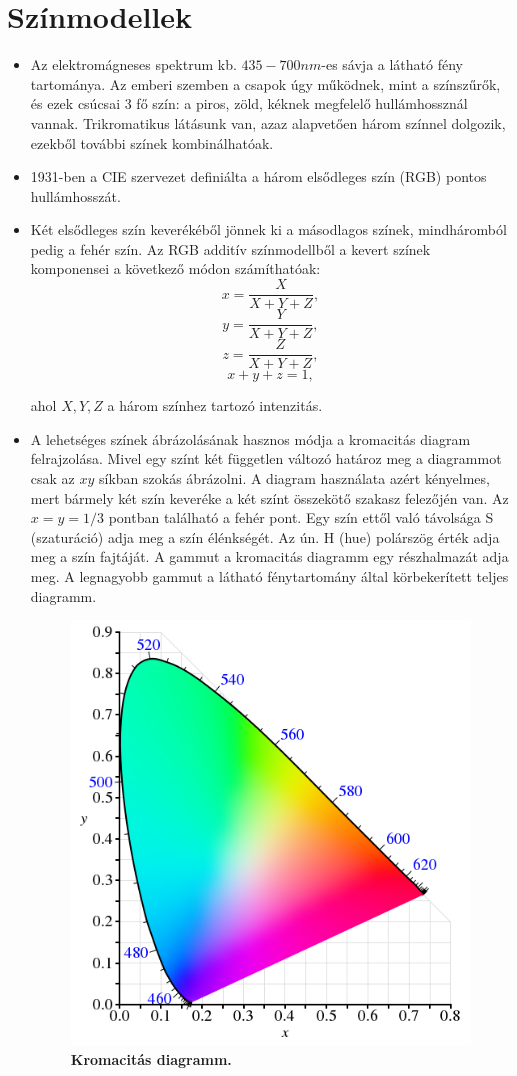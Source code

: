 \documentclass[12pt]{article}
\theoremstyle{plain}
\begin{document}
\section{Színmodellek}
\begin{itemize}
    \item Az elektromágneses spektrum kb. $435 - 700 nm$-es sávja a látható fény tartománya. Az emberi szemben a csapok úgy működnek, mint a színszűrők, és ezek csúcsai 3 fő szín: a piros, zöld, kéknek megfelelő hullámhossznál vannak. Trikromatikus látásunk van, azaz alapvetően három színnel dolgozik, ezekből további színek kombinálhatóak.
    \item 1931-ben a CIE szervezet definiálta a három elsődleges szín (RGB) pontos hullámhosszát.
    \item Két elsődleges szín keverékéből jönnek ki a másodlagos színek, mindháromból pedig a fehér szín. Az RGB additív színmodellből a kevert színek komponensei a következő módon számíthatóak:
    $$x = \frac{X}{X+Y+Z},$$
    $$y = \frac{Y}{X+Y+Z},$$
    $$z = \frac{Z}{X+Y+Z},$$
    $$x+y+z = 1,$$
    
    ahol $X,Y,Z$ a három színhez tartozó intenzitás.
    
    \item A lehetséges színek ábrázolásának hasznos módja a kromacitás diagram felrajzolása. Mivel egy színt két független változó határoz meg a diagrammot csak az $xy$ síkban szokás ábrázolni. A diagram használata azért kényelmes, mert bármely két szín keveréke a két színt összekötő szakasz felezőjén van. Az $x=y=1/3$ pontban található a fehér pont. Egy szín ettől való távolsága S (szaturáció) adja meg a szín élénkségét. Az ún. H (hue) polárszög érték adja meg a szín fajtáját.  A gammut a kromacitás diagramm egy részhalmazát adja meg. A legnagyobb gammut a látható fénytartomány által körbekerített teljes diagramm.
    
    
    \begin{figure}[H]
    \begin{center}
    \includegraphics[width=0.55\linewidth]{media/chro.png}
    \caption{\textbf{Kromacitás diagramm.}} 
    \label{fig:chro}
    \end{center}
\end{figure}
    

\end{itemize}
\end{document}
